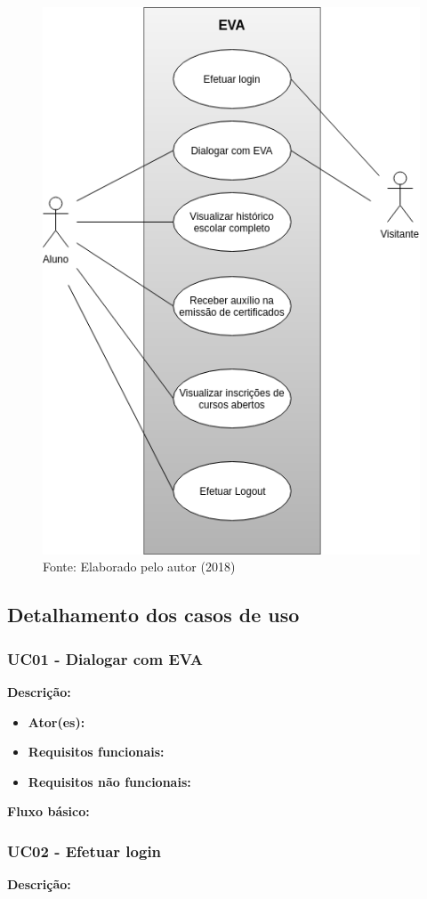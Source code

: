 \begin{figure}
\centering
\includegraphics[width=0.7\linewidth]{src/imagens/CasoDeUsoEva.png}
\caption{Fonte: Elaborado pelo autor (2018)}
\label{cap:03:fig:diagrama}
\end{figure}

\subsection{Detalhamento dos casos de uso}

\subsubsection{UC01 - Dialogar com EVA}
\textbf{Descrição:}

\begin{itemize}
    \item \textbf{Ator(es):}
    \item \textbf{Requisitos funcionais:}
    \item \textbf{Requisitos não funcionais:}
\end{itemize}

\textbf{Fluxo básico:}

\subsubsection{UC02 - Efetuar login}
\textbf{Descrição:}


